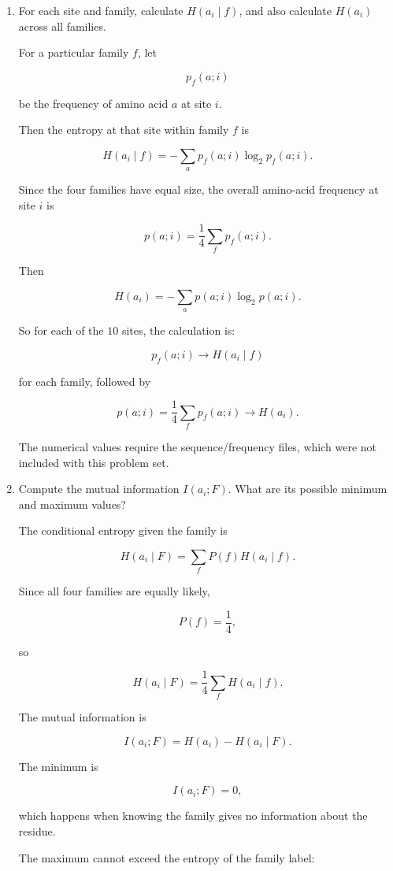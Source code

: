\documentclass[11pt]{article}
\begin{document}
\begin{enumerate}

\item For each site and family, calculate \(H(a_i\mid f)\), and also
calculate \(H(a_i)\) across all families.

For a particular family \(f\), let

\[
p_f(a;i)
\]

be the frequency of amino acid \(a\) at site \(i\).

Then the entropy at that site within family \(f\) is

\[
H(a_i\mid f)
=
-\sum_a p_f(a;i)\log_2 p_f(a;i).
\]

Since the four families have equal size, the overall amino-acid frequency at
site \(i\) is

\[
p(a;i)
=
\frac14
\sum_f p_f(a;i).
\]

Then

\[
H(a_i)
=
-\sum_a p(a;i)\log_2p(a;i).
\]

So for each of the \(10\) sites, the calculation is:

\[
p_f(a;i)
\longrightarrow
H(a_i\mid f)
\]

for each family, followed by

\[
p(a;i)
=
\frac14\sum_f p_f(a;i)
\longrightarrow
H(a_i).
\]

The numerical values require the sequence/frequency files, which were not
included with this problem set.

\item Compute the mutual information \(I(a_i;F)\). What are its possible
minimum and maximum values?

The conditional entropy given the family is

\[
H(a_i\mid F)
=
\sum_f P(f)H(a_i\mid f).
\]

Since all four families are equally likely,

\[
P(f)=\frac14,
\]

so

\[
H(a_i\mid F)
=
\frac14\sum_f H(a_i\mid f).
\]

The mutual information is

\[
I(a_i;F)
=
H(a_i)-H(a_i\mid F).
\]

The minimum is

\[
I(a_i;F)=0,
\]

which happens when knowing the family gives no information about the residue.

The maximum cannot exceed the entropy of the family label:


\end{enumerate}
\end{document}
